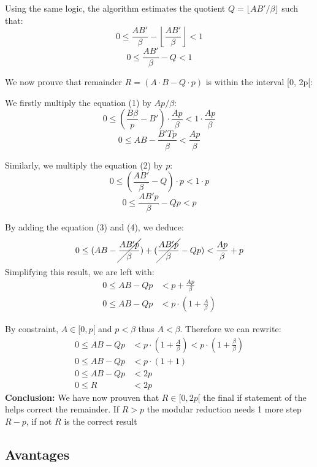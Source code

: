 \documentclass{article}
\begin{document}
Using the same logic, the algorithm estimates the quotient $Q = \lfloor AB'/\beta \rfloor$  such that:
\[0 \le \frac{AB'}{\beta} - \left\lfloor\frac{AB'}{\beta}\right\rfloor < 1\]
\begin{equation}
    0 \le \frac{AB'}{\beta} - Q < 1
\end{equation}

We now prouve that remainder $R = (A \cdot B -Q \cdot p)$ is within the interval [0, 2p[:

We firstly multiply the equation (1) by $Ap/\beta$:
\[0 \le \left( \frac{B\beta}{p} - B' \right) \cdot \frac{Ap}{\beta} < 1 \cdot \frac{Ap}{\beta}\]
\begin{equation}
    0 \le AB - \frac{B'Tp}{\beta} < \frac{Ap}{\beta}
\end{equation}

Similarly, we multiply the equation (2) by $p$:
\[0 \le \left( \frac{AB'}{\beta} - Q \right) \cdot p < 1 \cdot p\]
\begin{equation}
    0 \le \frac{AB'p}{\beta} - Qp < p
\end{equation}

By adding the equation (3) and (4), we deduce:
\[0 \le (AB - \cancel{\frac{AB'p}{\beta}}) + (\cancel{\frac{AB'p}{\beta}} - Qp) < \frac{Ap}{\beta} + p\]
Simplifying this result, we are left with:
\begin{align*}
    0 \le AB - Qp & < p + \frac{Ap}{\beta}          \\
    0 \le AB - Qp & < p \cdot (1 + \frac{A}{\beta})
\end{align*}

By constraint, $A \in [0, p[$ and $p < \beta$ thus $A < \beta$. Therefore we can rewrite:
\begin{align*}
    0 \le AB - Qp & < p \cdot (1 + \frac{A}{\beta}) < p\cdot (1 + \frac{\beta}{\beta}) \\
    0 \le AB - Qp & < p \cdot (1 + 1)                                                  \\
    0 \le AB - Qp & < 2p                                                               \\
    0 \le R       & < 2p
\end{align*}
\textbf{Conclusion:}
We have now prouven that $R \in [0, 2p[$ the final if statement of the helps correct the remainder. If $R > p$ the
modular reduction needs 1 more step $R - p$, if not $R$ is the correct result

\subsection{Avantages}
\end{document}
